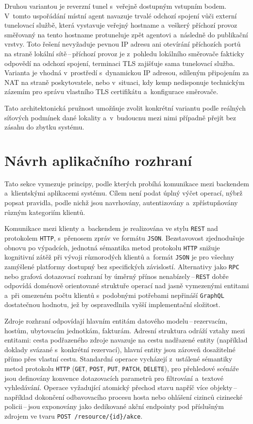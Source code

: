 Druhou variantou je reverzní tunel s~veřejně dostupným vstupním bodem.
V~tomto uspořádání místní agent navazuje trvalé odchozí spojení vůči externí tunelovací službě, která vystavuje veřejný hostname a~veškerý příchozí provoz směřovaný na tento hostname protuneluje zpět agentovi a~následně do publikační vrstvy.
Toto řešení nevyžaduje pevnou IP adresu ani otevírání příchozích portů na straně lokální sítě\,--\,příchozí provoz je z~pohledu lokálního směrovače fakticky odpovědí na odchozí spojení, terminaci TLS zajišťuje sama tunelovací služba.
Varianta je vhodná v~prostředí s~dynamickou IP adresou, sdíleným připojením za NAT na straně poskytovatele, nebo v~situaci, kdy kemp nedisponuje technickým zázemím pro správu vlastního TLS certifikátu a~konfigurace směrovače.

Tato architektonická pružnost umožňuje zvolit konkrétní variantu podle reálných síťových podmínek dané lokality a~v~budoucnu mezi nimi případně přejít bez zásahu do zbytku systému.

\section{Návrh aplikačního rozhraní}
\label{sec:rozhrani}
Tato sekce vymezuje principy, podle kterých probíhá komunikace mezi backendem a~klientskými aplikacemi systému.
Cílem není podat úplný výčet operací, nýbrž popsat pravidla, podle nichž jsou navrhovány, autentizovány a~zpřístupňovány různým kategoriím klientů.

Komunikace mezi klienty a~backendem je realizována ve stylu \texttt{REST} nad protokolem \texttt{HTTP}, s~přenosem zpráv ve formátu \texttt{JSON}.
Bezstavovost zjednodušuje obnovu po výpadcích, jednotná sémantika metod protokolu \texttt{HTTP} snižuje kognitivní zátěž při vývoji různorodých klientů a~formát \texttt{JSON} je pro všechny zamýšlené platformy dostupný bez specifických závislostí.
Alternativy jako \texttt{RPC} nebo grafová dotazovací rozhraní by úměrný přínos nenabízely\,--\,\texttt{REST} dobře odpovídá doménově orientované struktuře operací nad jasně vymezenými entitami a~při omezeném počtu klientů s~podobnými potřebami nepřináší \texttt{GraphQL} dostatečnou hodnotu, jež by ospravedlnila vyšší implementační složitost.

Zdroje rozhraní odpovídají hlavním entitám datového modelu\,--\,rezervacím, hostům, ubytovacím jednotkám, fakturám.
Adresní struktura odráží vztahy mezi entitami: cesta podřazeného zdroje navazuje na cestu nadřazené entity (například doklady svázané s~konkrétní rezervací), hlavní entity jsou zároveň dosažitelné přímo přes vlastní cestu.
Standardní operace vycházejí z~ustálené sémantiky metod protokolu \texttt{HTTP} (\texttt{GET}, \texttt{POST}, \texttt{PUT}, \texttt{PATCH}, \texttt{DELETE}), pro přehledové scénáře jsou definovány konvence dotazovacích parametrů pro filtrování a~textové vyhledávání.
Operace vyžadující atomický přechod stavu napříč více objekty\,--\,například dokončení odbavovacího procesu hosta nebo ohlášení cizinců cizinecké policii\,--\,jsou exponovány jako dedikované akční endpointy pod příslušným zdrojem ve tvaru \texttt{POST /resource/\{id\}/akce}.

